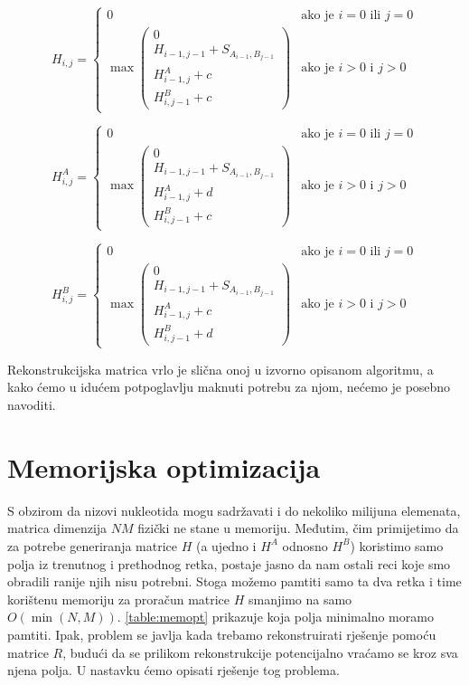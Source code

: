 \documentclass[times, utf8, zavrsni]{fer}
\begin{document}
$$
H_{i,j} =
\left\{ \begin{array}{ll}
	0 & \mbox{ako je } i=0 \mbox{ ili } j=0 \\
	\max \left( \begin{array}{l}
		0 \\
		H_{i-1,j-1} + S_{A_{i-1}, B_{j-1}} \\
		H^A_{i-1, j} + c \\
		H^B_{i, j-1} + c
	\end{array} \right) & \mbox{ako je } i>0 \mbox{ i } j>0
\end{array} \right.
$$

$$
H^{A}_{i,j} =
\left\{ \begin{array}{ll}
	0 & \mbox{ako je } i=0 \mbox{ ili } j=0 \\
	\max \left( \begin{array}{l}
		0 \\
		H_{i-1,j-1} + S_{A_{i-1}, B_{j-1}} \\
		H^A_{i-1, j} + d \\
		H^B_{i, j-1} + c
	\end{array} \right) & \mbox{ako je } i>0 \mbox{ i } j>0
\end{array} \right.
$$

$$
H^{B}_{i,j} =
\left\{ \begin{array}{ll}
	0 & \mbox{ako je } i=0 \mbox{ ili } j=0 \\
	\max \left( \begin{array}{l}
		0 \\
		H_{i-1,j-1} + S_{A_{i-1}, B_{j-1}} \\
		H^A_{i-1, j} + c \\
		H^B_{i, j-1} + d
	\end{array} \right) & \mbox{ako je } i>0 \mbox{ i } j>0
\end{array} \right.
$$

Rekonstrukcijska matrica vrlo je slična onoj u izvorno opisanom
algoritmu, a kako ćemo u idućem potpoglavlju maknuti potrebu za njom,
nećemo je posebno navoditi. 

\section{Memorijska optimizacija}
S obzirom da nizovi nukleotida mogu sadržavati i do nekoliko milijuna
elemenata, matrica dimenzija $N M$ fizički ne stane u memoriju. 
Međutim, čim primijetimo da za potrebe generiranja matrice $H$ (a ujedno i
$H^A$ odnosno $H^B$) koristimo
samo polja iz trenutnog i prethodnog retka, postaje jasno da nam ostali 
reci koje smo obradili ranije njih nisu potrebni. Stoga možemo pamtiti 
samo ta dva retka i time korištenu memoriju za proračun
matrice $H$ smanjimo na samo $O(\min(N, M))$. \autoref{table:memopt}
prikazuje koja polja minimalno moramo pamtiti. 
Ipak, problem se javlja
kada trebamo rekonstruirati rješenje pomoću matrice $R$, budući da
se prilikom rekonstrukcije potencijalno vraćamo se kroz sva njena polja. U
nastavku ćemo opisati rješenje tog problema.
\end{document}
